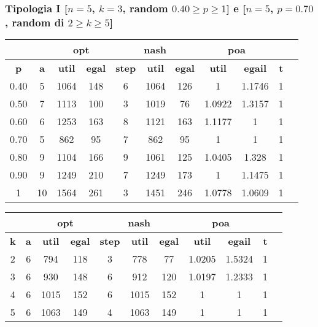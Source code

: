 \documentclass{beamer}
\begin{document}
\begin{frame}
\frametitle{Tipologia I [$n=5$, $k=3$, random $0.40 \geq p \geq 1$] e [$n=5$, $p=0.70$, random di $2 \geq k \geq 5$]}
\begin{table}[H]
\centering
\scalebox{0.9} {
\begin{tabular}{|c|c|c|c|c|c|c|c|c|c|c|}
\hline
\multicolumn{2}{|c|}{\textbf{}} & \multicolumn{2}{c|}{\textbf{\color{orange}opt}} & \multicolumn{3}{c|}{\textbf{\color{orange}nash}} & \multicolumn{2}{c|}{\textbf{\color{orange}poa}} & \multicolumn{1}{c|}{\textbf{}} \\ \hline
\textbf{\alert{p}} & \textbf{a} & \textbf{util} & \textbf{egal} & \textbf{step} & \textbf{util} & \textbf{egal} & \textbf{util} & \textbf{egail} & \textbf{t} \\ \hline
0.40 & 5 & 1064 & 148 & 6 & 1064 & 126 & 1 & 1.1746 & 1 \\ \hline
0.50 & 7 & 1113 & 100 & 3 & 1019 & 76 & 1.0922 & 1.3157 & 1 \\ \hline
0.60 & 6 & 1253 & 163 & 8 & 1121 & 163 & 1.1177 & 1 & 1 \\ \hline
0.70 & 5 & 862 & 95 & 7 & 862 & 95 & 1 & 1 & 1 \\ \hline
0.80 & 9 & 1104 & 166 & 9 & 1061 & 125 & 1.0405 & 1.328 & 1 \\ \hline
0.90 & 9 & 1249 & 210 & 7 & 1249 & 173 & 1 & 1.1475 & 1 \\ \hline
1 & 10 & 1564 & 261 & 3 & 1451 & 246 & 1.0778 & 1.0609 & 1 \\ \hline
\end{tabular}
}
\end{table}
\begin{table}[H]
\centering
\scalebox{0.9} {
\begin{tabular}{|c|c|c|c|c|c|c|c|c|c|c|}
\hline
\multicolumn{2}{|c|}{\textbf{}} & \multicolumn{2}{c|}{\textbf{\color{orange}opt}} & \multicolumn{3}{c|}{\textbf{\color{orange}nash}} & \multicolumn{2}{c|}{\textbf{\color{orange}poa}} & \multicolumn{1}{c|}{\textbf{}} \\ \hline
\textbf{\alert{k}} & \textbf{a} & \textbf{util} & \textbf{egal} & \textbf{step} & \textbf{util} & \textbf{egal} & \textbf{util} & \textbf{egail} & \textbf{t} \\ \hline
2 & 6 & 794 & 118 & 3 & 778 & 77 & 1.0205 & 1.5324 & 1 \\ \hline
3 & 6 & 930 & 148 & 6 & 912 & 120 & 1.0197 & 1.2333 & 1 \\ \hline
4 & 6 & 1015 & 152 & 6 & 1015 & 152 & 1 & 1 & 1 \\ \hline
5 & 6 & 1063 & 149 & 4 & 1063 & 149 & 1 & 1 & 1 \\ \hline
\end{tabular}
}
\end{table}
\end{frame}
\end{document}
